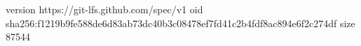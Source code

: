 version https://git-lfs.github.com/spec/v1
oid sha256:f1219b9fe588de6d83ab73dc40b3c08478ef7fd41c2b4fdf8ac894e6f2c274df
size 87544
